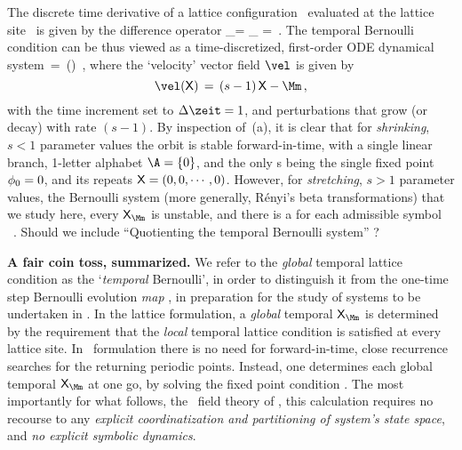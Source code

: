 The discrete time derivative of a lattice configuration \Xx\ evaluated at the
lattice site \zeit\ is given by the {difference operator}
\beq
\dot{\ssp}_\zeit =
\left[\frac{\partial\Xx}{\partial\zeit}\right]_\zeit
        =
\,.
The {temporal Bernoulli} condition  %
can be thus viewed as a time-discretized, first-order ODE dynamical
system
\beq
   \dot{\Xx} \,=\, \vel(\Xx) \,,
where the `velocity' vector field $\vel$ is given by
\[
\vel(\Xx) \,=\,
(s-1)\,\Xx-\Mm
\,,
\]
with the time increment set to $\Delta\zeit=1$, and perturbations that
grow (or decay) with rate $({s}-1)$. By inspection of
\,(a), it is clear that for \emph{shrinking},
${s}<1$  parameter values the orbit is stable for\-ward-in-time, with a
single linear branch, 1-letter alphabet $\A=\{0\}$, and the only
{\lattstate}s being the single fixed point  $\phi_0=0$, and its repeats
$\mathsf{X}=(0,0,\cdots,0)$. However, for \emph{stretching},  ${s}>1$  parameter
values, the Bernoulli system (more generally, R{\'e}nyi's beta
transformations) that we study here, every {\lattstate}
$\Xx_\Mm$ is unstable, and there is a {\lattstate} for each admissible
symbol \brick\ \Mm.
     {
    Should we include ``Quotienting the temporal Bernoulli system''
    ?
    }


\bigskip

\noindent\textbf{A fair coin toss, summarized.}
We refer to the \emph{global} temporal lattice condition 
as the `\emph{temporal} Bernoulli', in order to distinguish it from the
one-time step Bernoulli evolution \emph{map} , in
preparation for the study of \emph{\spt} systems to be undertaken in
. In the lattice formulation, a \emph{global} {temporal
{\lattstate}} $\Xx_\Mm$ is determined by the requirement that the
\emph{local} temporal lattice condition  is satisfied
at every lattice site. In \spt\ formulation there is no need for
for\-ward-in-time, close recurrence searches for the returning periodic
points. Instead, one determines each global {temporal {\lattstate}}
$\Xx_\Mm$ at one go, by solving the fixed point condition
. The most importantly for what follows, the \spt\
field theory of , this calculation requires no recourse to any
\emph{explicit coordinatization and partitioning of system's state
space}, and \emph{no explicit symbolic dynamics}.

